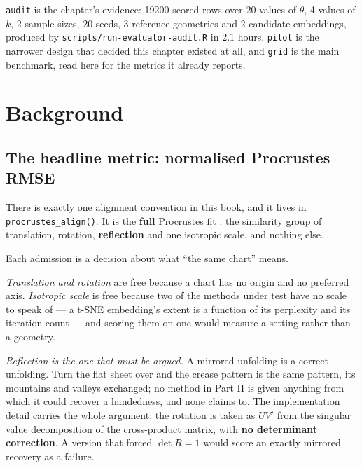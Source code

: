 \documentclass[
  british,
  a4paper,
]{book}
\newcounter{none} %
\begin{document}
\texttt{audit} is the chapter's evidence: 19200 scored rows over
20 values of \(\theta\), 4 values of \(k\),
2 sample sizes, 20 seeds,
3 reference geometries and
2 candidate embeddings, produced by
\texttt{scripts/run-evaluator-audit.R} in 2.1 hours.
\texttt{pilot} is the narrower design that decided this chapter existed at all, and
\texttt{grid} is the main benchmark, read here for the metrics it already reports.

\section{Background}\label{eval-background}

\subsection{The headline metric: normalised Procrustes RMSE}\label{the-headline-metric-normalised-procrustes-rmse}

There is exactly one alignment convention in this book, and it lives in
\texttt{procrustes\_align()}. It is the \textbf{full} Procrustes fit
\citep{schonemann1966procrustes, gower1975procrustes}: the similarity group of
translation, rotation, \textbf{reflection} and one isotropic scale, and nothing else.

Each admission is a decision about what ``the same chart'' means.

\emph{Translation and rotation} are free because a chart has no origin and no
preferred axis. \emph{Isotropic scale} is free because two of the methods under test
have no scale to speak of --- a t-SNE embedding's extent is a function of its
perplexity and its iteration count \citep{vandermaaten2008tsne} --- and scoring them on
one would measure a setting rather than a geometry.

\emph{Reflection is the one that must be argued.} A mirrored unfolding is a correct
unfolding. Turn the flat sheet over and the crease pattern is the same pattern,
its mountains and valleys exchanged; no method in Part II is given anything from
which it could recover a handedness, and none claims to. The implementation
detail carries the whole argument: the rotation is taken as \(UV'\) from the
singular value decomposition of the cross-product matrix, with \textbf{no determinant
correction}. A version that forced \(\det R = 1\) would score an exactly mirrored
recovery as a failure.
\end{document}
